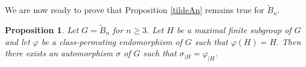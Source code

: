 \documentclass[a4paper, 11pt]{amsart}
\newtheorem{prop}[te]{Proposition}
\theoremstyle{definition}
\theoremstyle{remark}
\renewcommand{\geq}{\geqslant}
\begin{document}

We are now ready to prove that Proposition \ref{tildeAn} remains true for $\tilde{B}_n$.

\begin{prop}\label{tildeBn}
Let $G=\tilde{B}_n$ for $n\geq 3$. Let $H$ be a maximal finite subgroup of $G$ and let $\varphi$ be a class-permuting endomorphism of $G$ such that $\varphi(H)=H$. Then there exists an automorphism $\sigma$ of $G$ such that $\sigma_{\vert H}=\varphi_{\vert H}$.
\end{prop}
\end{document}
